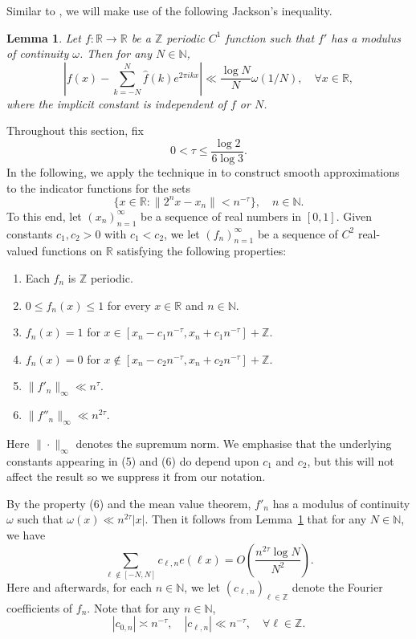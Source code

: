 \documentclass[amssymb,amsfonts,refcheck,12pt,verbatim,righttag]{amsart}
\makeatletter
\numberwithin{equation}{section} %
\newtheorem{lem}[thm]{Lemma}
\newcommand{\R}{\mathbb{R}}
\newcommand{\N}{\mathbb{N}}
\newcommand{\Z}{\mathbb{Z}}
\theoremstyle{plain}
\newcommand{\Rmnum}[1]{\expandafter\@slowromancap\romannumeral #1@}
\makeatother
\begin{document}
Similar to \cite{Baker25A}, we will make use of the following Jackson's inequality. 

\begin{lem}\cite[Theorem \Rmnum{4}, Chapter 1]{Jackson94T}\label{Jacksoninq}
	Let \( f : \mathbb{R} \to \mathbb{R} \) be a \( \mathbb{Z} \) periodic \( C^1 \) function such that $f'$ has a modulus of continuity \( \omega \). Then for any $N\in\N$, 
	\[
	\left| f(x) - \sum_{k=-N}^N \widehat{f}(k)e^{2\pi ik x} \right| \ll  \frac{\log N}{N} \omega(1/N), \quad \forall x\in \R,
	\]
 where the implicit constant is independent of \( f \) or \( N \).
\end{lem}

Throughout this section, fix  $$0<\tau\leq \frac{\log2}{6\log3}.$$ 
In the following, 
we  apply the technique in \cite{Baker25A} to construct smooth approximations to the indicator  functions for the sets 
\[\{x\in \R: \|2^{n}x-x_n\|<n^{-\tau}\}, \quad n\in\N.\]
To this end, let $(x_{n})_{n=1}^{\infty}$ be a sequence of real numbers in $[0,1]$. Given constants $c_{1},c_{2}>0$ with $c_{1}<c_{2}$, we let $(f_n)_{n=1}^{\infty}$ be a sequence of $C^2$ real-valued functions on $\R$ satisfying the following properties:
\begin{enumerate}
	\item Each $f_n$ is $\mathbb{Z}$ periodic.
	\item $0\leq f_{n}(x)\leq 1$ for every $x\in\mathbb{R}$ and $n\in \mathbb{N}$.
	\item $f_{n}(x)=1$ for $x\in [x_n-c_{1}n^{-\tau},x_n+c_{1}n^{-\tau}]+\mathbb{Z}.$
	\item $f_{n}(x)=0$ for $x\notin [x_n-c_{2}n^{-\tau},x_n+c_{2}n^{-\tau}]+\mathbb{Z}.$
	\item $\|f'_{n}\|_{\infty}\ll n^{\tau}.$
	\item $\|f''_{n}\|_{\infty}\ll n^{2\tau}.$
\end{enumerate}
Here $\|\cdot\|_{\infty}$ denotes the supremum norm. We emphasise that the underlying constants appearing in (5) and (6) do depend upon $c_{1}$ and $c_{2}$, but this will not affect the result so we suppress it from our notation. 

By the property (6) and the mean value theorem, $f'_n$ has a  modulus of continuity $\omega$ such that $\omega(x)\ll n^{2\tau}|x|$. Then it follows from Lemma~\ref{Jacksoninq} that for any $N\in\N$, we have 
\begin{equation}
	\label{errorbound}
	\sum_{\ell\notin [-N,N]}c_{\ell,n}e(\ell x)=O\left(\frac{n^{2\tau}\log N}{N^{2}}\right).
\end{equation}
Here and afterwards, for each $n\in\mathbb{N}$, we let $(c_{\ell,n})_{\ell \in\mathbb{Z}}$ denote the Fourier coefficients of $f_n$. Note that for any $n\in\N$, 
\begin{equation}\label{cellnasy}
|c_{0,n}|\asymp n^{-\tau}, \quad |c_{\ell,n}|\ll n^{-\tau},\quad  \forall \ell\in \Z. 
\end{equation}
\end{document}

